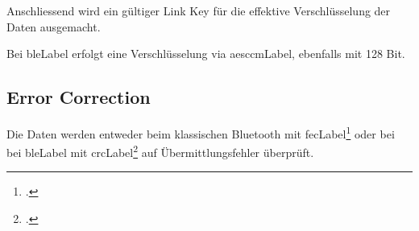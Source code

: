 Anschliessend wird ein gültiger Link Key für die effektive Verschlüsselung der Daten ausgemacht.

Bei \gls{bleLabel} erfolgt eine Verschlüsselung via \gls{aesccmLabel}, ebenfalls mit 128 Bit.

\subsection{Error Correction}
Die Daten werden entweder beim klassischen Bluetooth mit \gls{fecLabel}\footcite{Forward_error_correction_Wikipedia_2015-04-27} oder bei bei \gls{bleLabel} mit \gls{crcLabel}\footcite{Cyclic_redundancy_check_Wikipedia_2015-04-27} auf Übermittlungsfehler überprüft.

